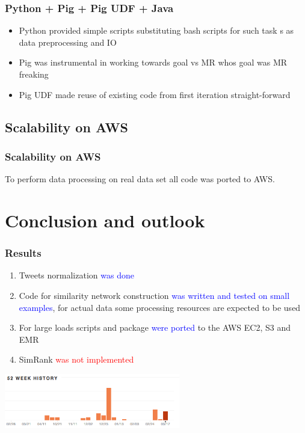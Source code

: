 \documentclass[handout]{beamer}
\begin{document}

\begin{frame}
\frametitle{\bf Python + Pig + Pig UDF + Java}

\begin{itemize}
\item Python provided simple scripts substituting bash scripts for such task s as data preprocessing and IO
\item Pig was instrumental in working towards goal vs MR whos goal was MR freaking
\item Pig UDF made reuse of existing code from first iteration straight-forward
\end{itemize}

\end{frame}


\subsection{Scalability on AWS}

\begin{frame}
\frametitle{\bf Scalability on AWS}

To perform data processing on real data set all code was ported to AWS.

\end{frame}


\section{Conclusion and outlook}

\begin{frame}
\frametitle{\bf Results}

\begin{enumerate}
\item Tweets normalization \textcolor{blue}{was done}
\item Code for similarity network construction \textcolor{blue}{was written and tested on small examples}, for actual data some processing resources are expected to be used
\item For large loads scripts and package \textcolor{blue}{were ported} to the AWS EC2, S3 and EMR
\item SimRank \textcolor{red}{was not implemented}
\end{enumerate}

\includegraphics[height=90px]{work-activity.png}

\end{frame}
\end{document}
